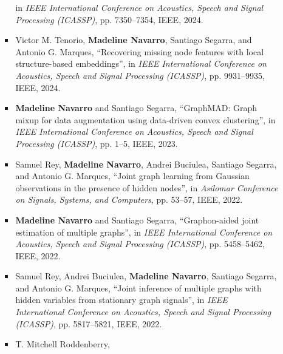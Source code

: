 \documentclass[letterpaper,10pt]{article}
\newcommand{\resumeBullet}[1]{\item[\textbullet]\small{#1}}
\newcommand{\resumeCustomBullet}[2]{\item[#1]\small{#2}}
\begin{document}
\begin{itemize}[leftmargin=0.25in, label={}]
\begin{itemize}[leftmargin=0.25in, label={}]
\begin{itemize}[leftmargin=0.35in, label={}]
{            in \textit{IEEE International Conference on Acoustics, Speech and Signal Processing (ICASSP)},
            pp. 7350--7354,
            IEEE,
            2024.
          }
          \resumeCustomBullet{{[C13]}}{
            Victor M. Tenorio,
            \textbf{Madeline Navarro},
            Santiago Segarra, 
            and
            Antonio G. Marques,
            ``Recovering missing node features with local structure-based embeddings'',
            in \textit{IEEE International Conference on Acoustics, Speech and Signal Processing (ICASSP)},
            pp. 9931--9935,
            IEEE,
            2024.
          }
          \resumeCustomBullet{{[C14]}}{
            \textbf{Madeline Navarro} 
            and
            Santiago Segarra,
            ``GraphMAD: Graph mixup for data augmentation using data-driven convex clustering'',
            in \textit{IEEE International Conference on Acoustics, Speech and Signal Processing (ICASSP)},
            pp. 1--5,
            IEEE,
            2023.
          }
          \resumeCustomBullet{{[C15]}}{
            Samuel Rey,
            \textbf{Madeline Navarro},
            Andrei Buciulea,
            Santiago Segarra, 
            and
            Antonio G. Marques, 
            ``Joint graph learning from Gaussian observations in the presence of hidden nodes'',
            in \textit{Asilomar Conference on Signals, Systems, and Computers},
            pp. 53--57,
            IEEE,
            2022.
          }
          \resumeCustomBullet{{[C16]}}{
            \textbf{Madeline Navarro} 
            and
            Santiago Segarra,
            ``Graphon-aided joint estimation of multiple graphs'',
            in \textit{IEEE International Conference on Acoustics, Speech and Signal Processing (ICASSP)},
            pp. 5458--5462,
            IEEE,
            2022.
          }
          \resumeCustomBullet{{[C17]}}{
            Samuel Rey,
            Andrei Buciulea,
            \textbf{Madeline Navarro},
            Santiago Segarra, 
            and
            Antonio G. Marques, 
            ``Joint inference of multiple graphs with hidden variables from stationary graph signals'',
            in \textit{IEEE International Conference on Acoustics, Speech and Signal Processing (ICASSP)},
            pp. 5817--5821,
            IEEE,
            2022.
          }
          \resumeCustomBullet{{[C18]}}{
            T. Mitchell Roddenberry,
}
\end{itemize}
\end{itemize}
\end{itemize}
\end{document}
